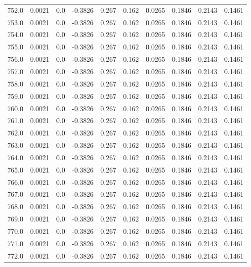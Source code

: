 \begin{longtable}{lrrrrrrrrr}
752.0 & 0.0021 & 0.0 & -0.3826 & 0.267 & 0.162 & 0.0265 & 0.1846 & 0.2143 & 0.1461 \\
753.0 & 0.0021 & 0.0 & -0.3826 & 0.267 & 0.162 & 0.0265 & 0.1846 & 0.2143 & 0.1461 \\
754.0 & 0.0021 & 0.0 & -0.3826 & 0.267 & 0.162 & 0.0265 & 0.1846 & 0.2143 & 0.1461 \\
755.0 & 0.0021 & 0.0 & -0.3826 & 0.267 & 0.162 & 0.0265 & 0.1846 & 0.2143 & 0.1461 \\
756.0 & 0.0021 & 0.0 & -0.3826 & 0.267 & 0.162 & 0.0265 & 0.1846 & 0.2143 & 0.1461 \\
757.0 & 0.0021 & 0.0 & -0.3826 & 0.267 & 0.162 & 0.0265 & 0.1846 & 0.2143 & 0.1461 \\
758.0 & 0.0021 & 0.0 & -0.3826 & 0.267 & 0.162 & 0.0265 & 0.1846 & 0.2143 & 0.1461 \\
759.0 & 0.0021 & 0.0 & -0.3826 & 0.267 & 0.162 & 0.0265 & 0.1846 & 0.2143 & 0.1461 \\
760.0 & 0.0021 & 0.0 & -0.3826 & 0.267 & 0.162 & 0.0265 & 0.1846 & 0.2143 & 0.1461 \\
761.0 & 0.0021 & 0.0 & -0.3826 & 0.267 & 0.162 & 0.0265 & 0.1846 & 0.2143 & 0.1461 \\
762.0 & 0.0021 & 0.0 & -0.3826 & 0.267 & 0.162 & 0.0265 & 0.1846 & 0.2143 & 0.1461 \\
763.0 & 0.0021 & 0.0 & -0.3826 & 0.267 & 0.162 & 0.0265 & 0.1846 & 0.2143 & 0.1461 \\
764.0 & 0.0021 & 0.0 & -0.3826 & 0.267 & 0.162 & 0.0265 & 0.1846 & 0.2143 & 0.1461 \\
765.0 & 0.0021 & 0.0 & -0.3826 & 0.267 & 0.162 & 0.0265 & 0.1846 & 0.2143 & 0.1461 \\
766.0 & 0.0021 & 0.0 & -0.3826 & 0.267 & 0.162 & 0.0265 & 0.1846 & 0.2143 & 0.1461 \\
767.0 & 0.0021 & 0.0 & -0.3826 & 0.267 & 0.162 & 0.0265 & 0.1846 & 0.2143 & 0.1461 \\
768.0 & 0.0021 & 0.0 & -0.3826 & 0.267 & 0.162 & 0.0265 & 0.1846 & 0.2143 & 0.1461 \\
769.0 & 0.0021 & 0.0 & -0.3826 & 0.267 & 0.162 & 0.0265 & 0.1846 & 0.2143 & 0.1461 \\
770.0 & 0.0021 & 0.0 & -0.3826 & 0.267 & 0.162 & 0.0265 & 0.1846 & 0.2143 & 0.1461 \\
771.0 & 0.0021 & 0.0 & -0.3826 & 0.267 & 0.162 & 0.0265 & 0.1846 & 0.2143 & 0.1461 \\
772.0 & 0.0021 & 0.0 & -0.3826 & 0.267 & 0.162 & 0.0265 & 0.1846 & 0.2143 & 0.1461 \\

\end{longtable}
